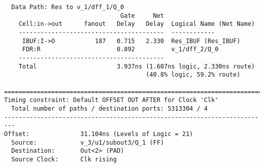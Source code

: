 \documentclass[14pt]{report}
\begin{document}
{\begin{verbatim}
  Data Path: Res to v_1/dff_1/Q_0
                                Gate     Net
    Cell:in->out      fanout   Delay   Delay  Logical Name (Net Name)
    ----------------------------------------  ------------
     IBUF:I->O           187   0.715   2.330  Res_IBUF (Res_IBUF)
     FDR:R                     0.892          v_1/dff_2/Q_0
    ----------------------------------------
    Total                      3.937ns (1.607ns logic, 2.330ns route)
                                       (40.8% logic, 59.2% route)

=========================================================================
Timing constraint: Default OFFSET OUT AFTER for Clock 'Clk'
  Total number of paths / destination ports: 5313304 / 4
-------------------------------------------------------------------------
Offset:              31.104ns (Levels of Logic = 21)
  Source:            v_3/u1/subout3/Q_1 (FF)
  Destination:       Out<2> (PAD)
  Source Clock:      Clk rising


\end{verbatim}}
\end{document}
